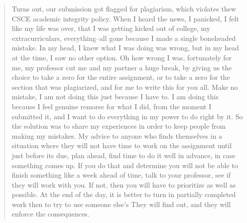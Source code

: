 \documentclass[12pt]{scrartcl}
\begin{document}
\begin{quote}
	Turns out, our submission got flagged for plagiarism, which violates thew CSCE academic integrity policy. When I heard the news, I panicked, I felt like my life was over, that I was getting kicked out of college, my extracurriculars, everything--all gone because I made a single boneheaded mistake. In my head, I knew what I was doing was wrong, but in my head at the time, I saw no other option. Oh how wrong I was, fortunately for me, my professor cut me and my partner a huge break, by giving us the choice to take a zero for the entire assignment, or to take a zero for the section that was plagiarized, and for me to write this for you all. Make no mistake, I am not doing this just because I have to. I am doing this because I feel genuine remorse for what I did, from the moment I submitted it, and I want to do everything in my power to do right by it. So the solution was to share my experiences in order to keep people from making my mistakes. 
	My advice to anyone who finds themselves in a situation where they will not have time to work on the assignment until just before its due, plan ahead, find time to do it well in advance, in case something comes up. If you do that and determine you will not be able to finish something like a week ahead of time, talk to your professor, see if they will work with you. If not, then you will have to prioritize as well as possible. At the end of the day, it is better to turn in partially completed work then to try to use someone else's They will find out, and they will enforce the consequences.
\end{quote}
\end{document}
